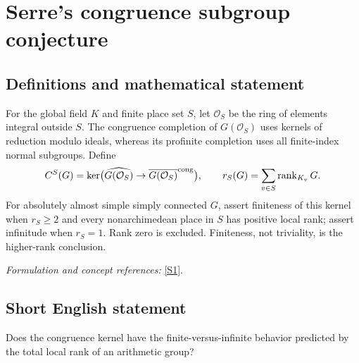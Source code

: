 \documentclass[11pt,a4paper]{article}
\newcommand{\sref}[2]{\hyperlink{source:#1:#2}{[S#2]}}
\newif\ifshowcatalogue
\newcommand{\cataloguescope}[1]{\ifshowcatalogue
 \paragraph{Exact scope in the supplied catalogue.}
 \begin{quote}\small #1\end{quote}\fi}
\numberwithin{equation}{section}
\begin{document}
\setcounter{section}{0}
\clearpage
\section*{\texorpdfstring{Serre's congruence subgroup conjecture}{Serre's congruence subgroup conjecture}}\label{30006737}
\subsection{Definitions and mathematical statement}
For the global field $K$ and finite place set $S$, let $\mathcal O_S$ be the ring of elements integral outside $S$. The congruence completion of $G(\mathcal O_S)$ uses kernels of reduction modulo ideals, whereas its profinite completion uses all finite-index normal subgroups. Define
\[
 C^S(G)=\ker\bigl(\widehat{G(\mathcal O_S)}\to\overline{G(\mathcal O_S)}^{\rm cong}\bigr),
 \qquad r_S(G)=\sum_{v\in S}\operatorname{rank}_{K_v}G.
\]
For absolutely almost simple simply connected $G$, assert finiteness of this kernel when $r_S\ge2$ and every nonarchimedean place in $S$ has positive local rank; assert infinitude when $r_S=1$. Rank zero is excluded. Finiteness, not triviality, is the higher-rank conclusion.
\par\smallskip\textit{Formulation and concept references:} \sref{30006737}{1}.
\cataloguescope{Let K be a global field (a number field or the function field of a curve over a finite field), G an absolutely almost simple simply connected algebraic K-group, and S a finite nonempty set of places of K containing every archimedean place when K is a number field. Put r\_S(G) = sum over v in S of rank\_\{K\_v\}(G), and let C\textasciicircum{}S(G) be the kernel of the natural surjection from the profinite completion of G(O\_S) (S-arithmetic topology) onto its S-congruence completion. Prove Serre's congruence subgroup conjecture: (a) if r\_S(G) >= 2 and rank\_\{K\_v\}(G) > 0 for every nonarchimedean v in S, then C\textasciicircum{}S(G) is finite; (b) if r\_S(G) = 1, then C\textasciicircum{}S(G) is infinite. The case r\_S(G) = 0 (finite G(O\_S), trivial kernel) is excluded. Finiteness of C\textasciicircum{}S(G) is the assertion; triviality is a stronger statement not required. Which specific groups remain unsettled is status information, not part of the target.}
\subsection{Short English statement}
Does the congruence kernel have the finite-versus-infinite behavior predicted by the total local rank of an arithmetic group?
\end{document}
